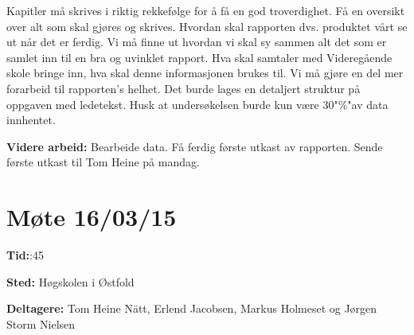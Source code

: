 \hspace{-17pt}Kapitler må skrives i riktig rekkefølge for å få en god troverdighet.\newline
Få en oversikt over alt som skal gjøres og skrives.\newline
Hvordan skal rapporten dvs. produktet vårt se ut når det er ferdig.\newline
Vi må finne ut hvordan vi skal sy sammen alt det som er samlet inn til en bra og uvinklet rapport.\newline
Hva skal samtaler med Videregående skole bringe inn, hva skal denne informasjonen brukes til.\newline
Vi må gjøre en del mer forarbeid til rapporten’s helhet.\newline
Det burde lages en detaljert struktur på oppgaven med ledetekst.\newline
Husk at undersøkelsen burde kun være 30"\%"av data innhentet.\newline


\vspace{20pt}

\hspace{-17pt}\textbf{Videre arbeid:}\newline
Bearbeide data.\newline
Få ferdig første utkast av rapporten.\newline
Sende første utkast til Tom Heine på mandag.\newline

\newpage


\section{Møte 16/03/15}

\textbf{Tid:}:45\newline 

\hspace{-17pt}\textbf{Sted:}\newline 
Høgskolen i Østfold
\newline

\hspace{-17pt}\textbf{Deltagere:}\newline 
Tom Heine Nätt, Erlend Jacobsen, Markus Holmeset og Jørgen Storm Nielsen\newline

